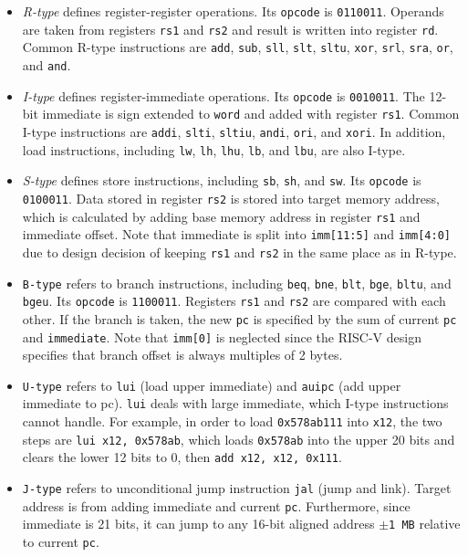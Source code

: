 \begin{itemize}
    \item \textit{R-type} defines register-register operations. Its \texttt{opcode} is \texttt{0110011}. Operands are taken from registers \texttt{rs1} and \texttt{rs2} and result is written into register \texttt{rd}. Common R-type instructions are \texttt{add}, \texttt{sub}, \texttt{sll}, \texttt{slt}, \texttt{sltu}, \texttt{xor}, \texttt{srl}, \texttt{sra}, \texttt{or}, and \texttt{and}.
    
    \item \textit{I-type} defines register-immediate operations. Its \texttt{opcode} is \texttt{0010011}. The 12-bit immediate is sign extended to \texttt{word} and added with register \texttt{rs1}.
    Common I-type instructions are \texttt{addi}, \texttt{slti}, \texttt{sltiu}, \texttt{andi}, \texttt{ori}, and \texttt{xori}. In addition, load instructions, including \texttt{lw}, \texttt{lh}, \texttt{lhu}, \texttt{lb}, and \texttt{lbu}, are also I-type.
    
    \item \textit{S-type} defines store instructions, including \texttt{sb}, \texttt{sh}, and \texttt{sw}. Its \texttt{opcode} is \texttt{0100011}. Data stored in register \texttt{rs2} is stored into target memory address, which is calculated by adding base memory address in register \texttt{rs1} and immediate offset. Note that immediate is split into \texttt{imm[11:5]} and \texttt{imm[4:0]} due to design decision of keeping \texttt{rs1} and \texttt{rs2} in the same place as in R-type.
    
    \item \texttt{B-type} refers to branch instructions, including \texttt{beq}, \texttt{bne}, \texttt{blt}, \texttt{bge}, \texttt{bltu}, and \texttt{bgeu}. Its \texttt{opcode} is \texttt{1100011}. Registers \texttt{rs1} and \texttt{rs2} are compared with each other. If the branch is taken, the new \texttt{pc} is specified by the sum of current \texttt{pc} and \texttt{immediate}. Note that \texttt{imm[0]} is neglected since the RISC-V design specifies that branch offset is always multiples of 2 bytes.
    
    \item \texttt{U-type} refers to \texttt{lui} (load upper immediate) and \texttt{auipc} (add upper immediate to pc). \texttt{lui} deals with large immediate, which I-type instructions cannot handle. For example, in order to load \texttt{0x578ab111} into \texttt{x12}, the two steps are \texttt{lui x12, 0x578ab}, which loads \texttt{0x578ab} into the upper 20 bits and clears the lower 12 bits to 0, then \texttt{add x12, x12, 0x111}.
    
    \item \texttt{J-type} refers to unconditional jump instruction \texttt{jal} (jump and link). Target address is from adding immediate and current \texttt{pc}. Furthermore, since immediate is 21 bits, it can jump to any 16-bit aligned address \texttt{$\pm$1 MB} relative to current \texttt{pc}.
\end{itemize}

